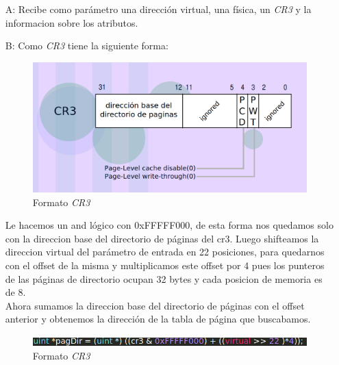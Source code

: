 \begin{itemize}
	\item[A:] Recibe como parámetro una dirección virtual, una física, un \textit{CR3} y la informacion sobre los atributos. 

	\item[B:] Como \textit{CR3} tiene la siguiente forma:
	 
	 \begin{figure}[H]
	 \begin{center}
  	 \includegraphics[width=\linewidth]{ejercicio3/cr3.png}
  	 \caption{{\small Formato \textit{CR3} }}
	 \endminipage
	 \end{center}
	 \end{figure}

	  Le hacemos un and lógico con 0xFFFFF000, de esta forma nos quedamos solo con la direccion base del directorio de páginas del cr3. Luego shifteamos la direccion virtual del parámetro de entrada en 22 posiciones, para quedarnos con el offset de la misma y multiplicamos este offset por 4 pues los punteros de las páginas de directorio ocupan 32 bytes y cada posicion de memoria es de 8.\\

	  Ahora sumamos la direccion base del directorio de páginas con el offset anterior y obtenemos la dirección de la tabla de página que buscabamos.

	 \begin{figure}[H]
	 \begin{center}
  	 \includegraphics[width=\linewidth]{ejercicio3/fun1.png}
  	 \caption{{\small Formato \textit{CR3} }}
	 \endminipage
	 \end{center}
	 \end{figure}


\end{itemize}
